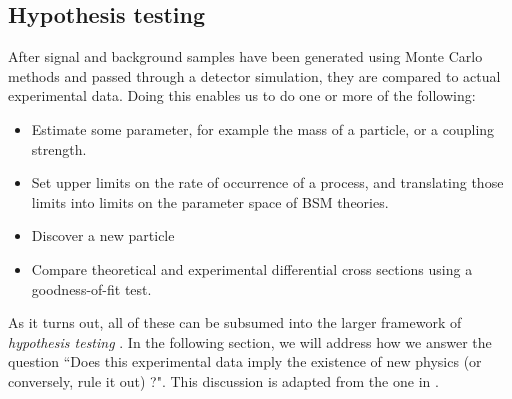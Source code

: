 \subsection{Hypothesis testing}
After signal and background samples have been generated using Monte Carlo methods and passed through a detector simulation, they are compared to actual experimental data. Doing this enables us to do one or more of the following:
\begin{itemize}
  \item Estimate some parameter, for example the mass of a particle, or a coupling strength.
  \item Set upper limits on the rate of occurrence of a process, and translating those limits into limits on the parameter space of BSM theories.
  \item Discover a new particle
  \item Compare theoretical and experimental differential cross sections using a goodness-of-fit test.
\end{itemize}
As it turns out, all of these can be subsumed into the larger framework of \emph{hypothesis testing} \citep{Heinrich}. 
In the following section, we will address how we answer the question ``Does this experimental data imply the existence of new physics (or conversely, rule it out) ?". This discussion is adapted from the one in \citep{Cranmer2015}. 

